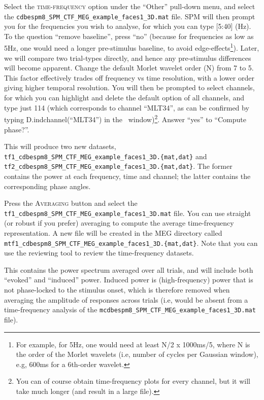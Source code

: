 Select the \textsc{time-frequency} option under the ``Other'' pull-down menu, and select the \texttt{cdbespm8\_\-SPM\_\-CTF\_\-MEG\_\-example\_\-faces1\_\-3D.mat} file. SPM will then prompt you for the frequencies you wish to analyse, for which you can type [5:40] (Hz). To the question ``remove baseline'', press ``no'' (because for frequencies as low as 5Hz, one would need a longer pre-stimulus baseline, to avoid edge-effects\footnote{For example, for 5Hz, one would need at least N/2 x 1000ms/5, where N is the order of the Morlet wavelets (i.e, number of cycles per Gaussian window), e.g, 600ms for a 6th-order wavelet.}). Later, we will compare two trial-types directly, and hence any pre-stimulus differences will become apparent. Change the default Morlet wavelet order (N) from 7 to 5. This factor effectively trades off frequency vs time resolution, with a lower order giving higher temporal resolution. You will then be prompted to select channels, for which you can highlight and delete the default option of all channels, and type just 114 (which corresponds to channel ``MLT34'', as can be confirmed by typing D.indchannel(``MLT34'') in the \matlab\ window)\footnote{You can of course obtain time-frequency plots for every channel, but it will take much longer (and result in a large file).}. Answer ``yes'' to ``Compute phase?''.

This will produce two new datasets, \texttt{tf1\_\-cdbespm8\_\-SPM\_\-CTF\_\-MEG\_\-example\_\-faces1\_3D.\{mat,dat\}} and  \texttt{tf2\_\-cdbespm8\_\-SPM\_\-CTF\_\-MEG\_\-example\_\-faces1\_\-3D.\{mat,dat\}}. The former contains the power at each frequency, time and channel; the latter contains the corresponding phase angles.

Press the \textsc{Averaging} button and select the \texttt{tf1\_\-cdbespm8\_\-SPM\_\-CTF\_\-MEG\_\-example\_\-faces1\_\-3D.mat} file. You can use straight (or robust if you prefer) averaging to compute the average time-frequency representation. A new file will be created in the MEG directory called \texttt{mtf1\_cdbespm8\_\-SPM\_\-CTF\_\-MEG\_\-example\_\-faces1\_\-3D.\{mat,dat\}}. Note that you can use the reviewing tool to review the time-frequency datasets.

This contains the power spectrum averaged over all trials, and will include both ``evoked'' and ``induced'' power. Induced power is (high-frequency) power that is not phase-locked to the stimulus onset, which is therefore removed when averaging the amplitude of responses across trials (i.e, would be absent from a time-frequency analysis of the \texttt{mcdbespm8\_SPM\_\-CTF\_\-MEG\_\-example\_\-faces1\_\-3D.mat} file).

